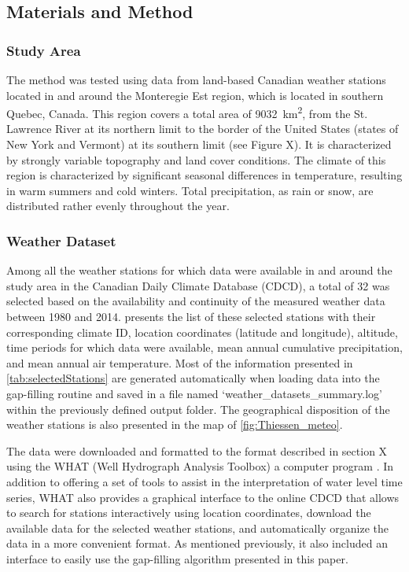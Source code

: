 \documentclass[TechnicalNoteMeteo.tex]{subfiles}
\begin{document}
\subsection{Materials and Method}

\subsubsection{Study Area}

The method was tested using data from land-based Canadian weather stations located in and around the Monteregie Est region, which is located in southern Quebec, Canada. This region covers a total area of \SI{9032}{km^2}, from the St. Lawrence River at its northern limit to the border of the United States (states of New York and Vermont) at its southern limit (see Figure X). It is characterized by strongly variable topography and land cover conditions. The climate of this region is characterized by significant seasonal differences in temperature, resulting in warm summers and cold winters. Total precipitation, as rain or snow, are distributed rather evenly throughout the year.

\subsubsection{Weather Dataset}

Among all the weather stations for which data were available in and around the study area in the Canadian Daily Climate Database (CDCD), a total of 32 was selected based on the availability and continuity of the measured weather data between 1980 and 2014.  presents the list of these selected stations with their corresponding climate ID, location coordinates (latitude and longitude), altitude, time periods for which data were available, mean annual cumulative precipitation, and mean annual air temperature. Most of the information presented in \cref{tab:selectedStations} are generated automatically when loading data into the gap-filling routine and saved in a file named `weather\_datasets\_summary.log' within the previously defined output folder. The geographical disposition of the weather stations is also presented in the map of \cref{fig:Thiessen_meteo}.

The data were downloaded and formatted to the format described in section X using the WHAT (Well Hydrograph Analysis Toolbox) a computer program \citep{gosselin_user_2015}. In addition to offering a set of tools to assist in the interpretation of water level time series, WHAT also provides a graphical interface to the online CDCD that allows to search for stations interactively using location coordinates, download the available data for the selected weather stations, and automatically organize the data in a more convenient format. As mentioned previously, it also included an interface to easily use the gap-filling algorithm presented in this paper.
\end{document}
